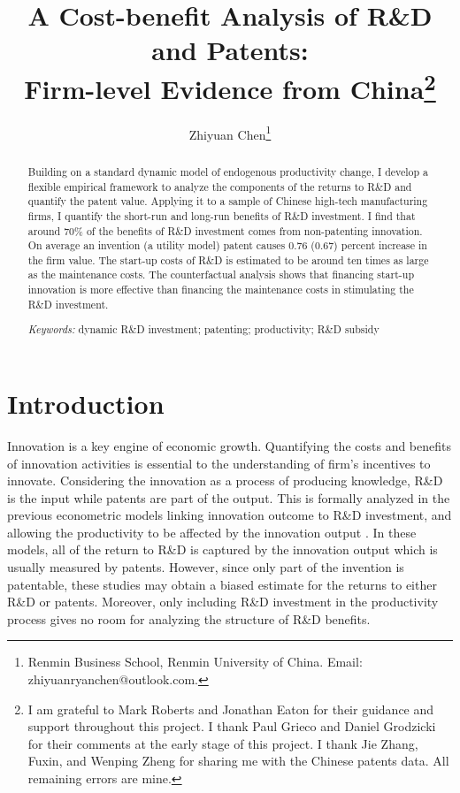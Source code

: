 \documentclass[English]{article}
\begin{document}
\title{A Cost-benefit Analysis of R\&D and Patents:
\\ Firm-level Evidence from China\footnote{I am grateful to Mark Roberts and Jonathan Eaton for their guidance and support throughout this project. I thank Paul Grieco and Daniel Grodzicki for their comments at the early stage of this project. I thank Jie Zhang, Fuxin, and Wenping Zheng for sharing me with the Chinese patents data. All remaining errors are mine.}}
\author{Zhiyuan Chen\footnote{Renmin Business School, Renmin University of China. Email: zhiyuanryanchen@outlook.com.}}
\maketitle
\begin{abstract}
Building on a standard dynamic model of endogenous productivity change, I develop a flexible empirical framework to analyze the components of the returns to R\&D and quantify the patent value. Applying it to a sample of Chinese high-tech manufacturing firms, I quantify the short-run and long-run benefits of R\&D investment. I find that around 70\% of the benefits of R\&D investment comes from non-patenting innovation. On average an invention (a utility model) patent causes 0.76 (0.67) percent increase in the firm value. The start-up costs of R\&D is estimated to be around ten times as large as the maintenance costs. The counterfactual analysis shows that financing start-up innovation is more effective than financing the maintenance costs in stimulating the R\&D investment. 

\textsl{Keywords:} dynamic R\&D investment; patenting; productivity; R\&D subsidy
\end{abstract}

\newpage

\section{Introduction}

Innovation is a key engine of economic growth. Quantifying the costs and benefits of innovation activities is essential to the understanding of firm's incentives to innovate. Considering the innovation as a process of producing knowledge, R\&D is the input while patents are part of the output. This is formally analyzed in the previous econometric models linking innovation outcome to R\&D investment, and allowing the productivity to be affected by the innovation output \citep{crepon1998research,mairesse2005,raymond2015}. In these models, all of the return to R\&D is captured by the innovation output which is usually measured by patents. However, since only part of the invention is patentable, these studies may obtain a biased estimate for the returns to either R\&D or patents. Moreover, only including R\&D investment in the productivity process gives no room for analyzing the structure of R\&D benefits.
\end{document}
